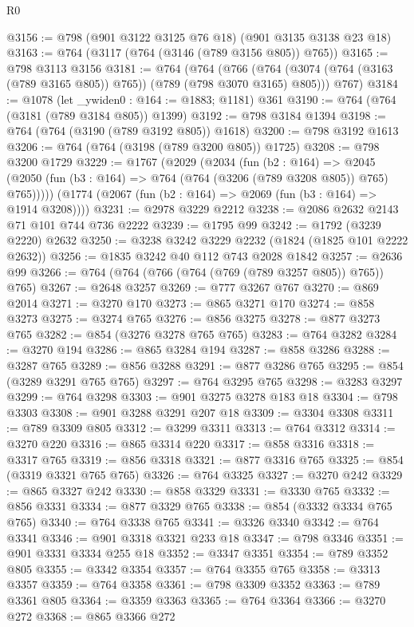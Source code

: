\begin{lexlean}{R0}
\begin{coremodule}
@3156 := @798 (@901 @3122 @3125 @76 @18) (@901 @3135 @3138 @23 @18)
@3163 := @764 (@3117 (@764 (@3146 (@789 @3156 @805)) @765))
@3165 := @798 @3113 @3156
@3181 := @764
    (@764
      (@766 (@764 (@3074 (@764 (@3163 (@789 @3165 @805)) @765)) (@789 (@798 @3070 @3165) @805)))
      @767)
@3184 := @1078 (let _ywiden0 : @164 := @1883; @1181) @361
@3190 := @764 (@764 (@3181 (@789 @3184 @805)) @1399)
@3192 := @798 @3184 @1394
@3198 := @764 (@764 (@3190 (@789 @3192 @805)) @1618)
@3200 := @798 @3192 @1613
@3206 := @764 (@764 (@3198 (@789 @3200 @805)) @1725)
@3208 := @798 @3200 @1729
@3229 := @1767
    (@2029
      (@2034
        (fun (b2 : @164) =>
        @2045 (@2050 (fun (b3 : @164) => @764 (@764 (@3206 (@789 @3208 @805)) @765) @765)))))
    (@1774 (@2067 (fun (b2 : @164) => @2069 (fun (b3 : @164) => @1914 @3208))))
@3231 := @2978 @3229 @2212
@3238 := @2086 @2632 @2143 @71 @101 @744 @736 @2222
@3239 := @1795 @99
@3242 := @1792 (@3239 @2220) @2632
@3250 := @3238 @3242 @3229 @2232 (@1824 (@1825 @101 @2222 @2632))
@3256 := @1835 @3242 @40 @112 @743 @2028 @1842
@3257 := @2636 @99
@3266 := @764 (@764 (@766 (@764 (@769 (@789 @3257 @805)) @765)) @765)
@3267 := @2648 @3257
@3269 := @777 @3267 @767
@3270 := @869 @2014
@3271 := @3270 @170
@3273 := @865 @3271 @170
@3274 := @858 @3273
@3275 := @3274 @765
@3276 := @856 @3275
@3278 := @877 @3273 @765
@3282 := @854 (@3276 @3278 @765 @765)
@3283 := @764 @3282
@3284 := @3270 @194
@3286 := @865 @3284 @194
@3287 := @858 @3286
@3288 := @3287 @765
@3289 := @856 @3288
@3291 := @877 @3286 @765
@3295 := @854 (@3289 @3291 @765 @765)
@3297 := @764 @3295 @765
@3298 := @3283 @3297
@3299 := @764 @3298
@3303 := @901 @3275 @3278 @183 @18
@3304 := @798 @3303
@3308 := @901 @3288 @3291 @207 @18
@3309 := @3304 @3308
@3311 := @789 @3309 @805
@3312 := @3299 @3311
@3313 := @764 @3312
@3314 := @3270 @220
@3316 := @865 @3314 @220
@3317 := @858 @3316
@3318 := @3317 @765
@3319 := @856 @3318
@3321 := @877 @3316 @765
@3325 := @854 (@3319 @3321 @765 @765)
@3326 := @764 @3325
@3327 := @3270 @242
@3329 := @865 @3327 @242
@3330 := @858 @3329
@3331 := @3330 @765
@3332 := @856 @3331
@3334 := @877 @3329 @765
@3338 := @854 (@3332 @3334 @765 @765)
@3340 := @764 @3338 @765
@3341 := @3326 @3340
@3342 := @764 @3341
@3346 := @901 @3318 @3321 @233 @18
@3347 := @798 @3346
@3351 := @901 @3331 @3334 @255 @18
@3352 := @3347 @3351
@3354 := @789 @3352 @805
@3355 := @3342 @3354
@3357 := @764 @3355 @765
@3358 := @3313 @3357
@3359 := @764 @3358
@3361 := @798 @3309 @3352
@3363 := @789 @3361 @805
@3364 := @3359 @3363
@3365 := @764 @3364
@3366 := @3270 @272
@3368 := @865 @3366 @272

\end{coremodule}
\end{lexlean}
